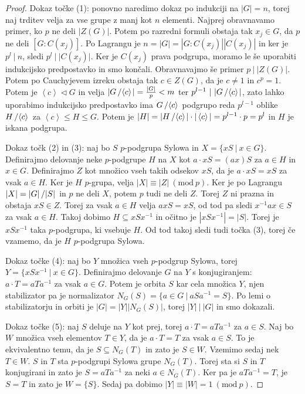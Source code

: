 \documentclass[10pt, a4paper]{article}
\newenvironment{noticeC}{%
  \tcolorbox[%
  notitle,
  empty,
  enhanced,  %
  breakable,
  coltext=black, 
  fontupper=\rmfamily,
  parbox=false,
  noparskip,
  sharp corners,
  boxrule=-1pt,  %
  frame hidden,
  left=7pt,  %
  right=7pt,
  top=5pt,
  bottom=5pt,
  before skip=2.5ex plus 2pt,
  after skip=2.5ex plus 2pt,
  overlay unbroken and last={%
  },
  ]}
{\endtcolorbox}
\newenvironment{dokaz}%
  {\begin{noticeC}\begin{proof}}%
  {\end{proof}\end{noticeC}}
\newcommand{\quot}[2]{{\raisebox{0em}{$#1$}\left/\raisebox{0em}{$#2$}\right.}}
\newcommand{\gen}[1]{\left\langle #1 \right\rangle}
\newcommand{\Mod}[1]{\ (\mathrm{mod}\ #1)}
\begin{document}
\begin{dokaz}
  Dokaz točke (1): ponovno naredimo dokaz po indukciji na $|G| = n$,
  torej naj trditev velja za vse grupe z manj kot $n$ elementi.
  Najprej obravnavamo primer, ko $p$ ne deli $|Z(G)|$.
  Potem po razredni formuli obstaja tak $x_j \in G$,
  da $p$ ne deli $[G: C(x_j)]$.
  Po Lagrangu je $n = |G| = |G: C(x_j)| |C(x_j)|$ in ker je $p^l\ |\ n$, sledi $p^l\ |\ |C(x_j)|.$
  Ker je $C(x_j)$ prava podgrupa, moramo le še uporabiti indukcijsko predpostavko in smo končali.
  Obravnavajmo še primer $p\ |\ |Z(G)|$. Potem po Cauchyjevem izreku obstaja tak $c \in Z(G)$,
  da je $c \neq 1$ in $c^p = 1.$ Potem je $\gen{c} \lhd G$ in velja 
  $|\quot{G}{\gen{c}}| = \frac{|G|}{p} < m$ ter $p^{l-1}\ |\ |\quot{G}{\gen{c}}|$, zato lahko uporabimo indukcijsko 
  predpostavko ima $\quot{G}{\gen{c}}$ podgrupo reda $p^{l-1}$ oblike $\quot{H}{\gen{c}}$
  za $\gen{c} \leq H \leq G$.
  Potem je $|H| = |\quot{H}{\gen{c}}| \cdot |\gen{c}| = p^{l-1} \cdot p = p^l$ in $H$ je iskana podgrupa.

  Dokaz točk (2) in (3):
  naj bo $S$ $p$-podgrupa Sylowa in $X = \{xS\ |\ x \in G\}$.
  Definirajmo delovanje neke $p$-podgrupe $H$ na $X$ kot $a \cdot xS = (ax)S$
  za $a \in H$ in $x \in G$. Definirajmo $Z$ kot množico vseh takih odsekov $xS$,
  da je $a \cdot xS = xS$ za vsak $a \in H$.
  Ker je $H$ $p$-grupa, velja $|X| \equiv |Z| \Mod{p}$.
  Ker je po Lagrangu $|X| = \quot{|G|}{|S|}$ in $p$ ne deli $X$,
  potem $p$ tudi ne deli $Z$. Torej $Z$ ni prazna in obstaja $xS \in Z$.
  Torej za vsak $a \in H$ velja $axS = xS$, od tod pa sledi $x^{-1} a x \in S$ za vsak $a \in H$.
  Takoj dobimo $H \subseteq x S x^{-1}$ in očitno je $|xSx^{-1}| = |S|$.
  Torej je $xSx^{-1}$ taka $p$-podgrupa, ki vsebuje $H$.
  Od tod takoj sledi tudi točka (3), torej če vzamemo, da je $H$ $p$-podgrupa Sylowa.

  Dokaz točke (4): naj bo $Y$ množica vseh $p$-podgrup Sylowa, torej
  $Y = \{xSx^{-1}\ |\ x \in G\}$. Definirajmo delovanje $G$ na $Y$ s konjugiranjem:
  $a \cdot T = a T a^{-1}$ za vsak $a \in G$.
  Potem je orbita $S$ kar cela množica $Y$, njen stabilizator pa je normalizator
  $N_G (S) = \{a \in G\ |\ aSa^{-1} = S\}$.
  Po lemi o stabilizatorju in orbiti je $|G| = |Y| |N_G (S)|$, torej 
  $|Y|\ |\ |G|$ in smo dokazali.

  Dokaz točke (5): naj $S$ deluje na $Y$ kot prej, torej 
  $a \cdot T = a T a^{-1}$ za $a \in S$.
  Naj bo $W$ množica vseh elementov $T \in Y$,
  da je $a \cdot T = T$ za vsak $a \in S$.
  To je ekvivalentno temu, da je $S \subseteq N_G (T)$ in zato je $S \in W$.
  Vzemimo sedaj nek $T \in W$. $S$ in $T$ sta
  $p$-podgrupi Sylowa grupe $N_G (T)$. Torej sta si $S$ in $T$ konjugirani 
  in zato je $S = a T a^{-1}$ za neki $a \in N_G (T)$.
  Ker pa je $a T a^{-1} = T$, je $S = T$ in zato je $W = \{S\}$.
  Sedaj pa dobimo $|Y| \equiv |W| = 1 \Mod{p}$.
\end{dokaz}
\end{document}
